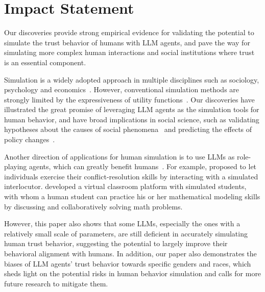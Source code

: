 \section{Impact Statement}\label{impact statement}


Our discoveries provide strong empirical evidence for validating the potential to simulate the trust behavior of humans with LLM agents, and pave the way for simulating more complex human interactions and  social institutions where trust is an essential component. 

Simulation is a widely adopted approach in multiple disciplines such as sociology, psychology and economics~\citep{ziems2023can}. However, conventional simulation methods are strongly limited by the expressiveness of utility functions~\citep{ellsberg1961risk,machina1987choice}. Our discoveries have illustrated the great promise of leveraging LLM agents as the simulation tools for human behavior, and have broad implications in social science, such as validating hypotheses about the causes of social phenomena~\citep{easley2010networks} and predicting the effects of policy changes~\citep{kleinberg2018human}.



Another direction of applications for human simulation is to use LLMs as role-playing agents, which can greatly benefit humans~\citep{yang2024social,chen2024persona,Shanahan2023role,ma2024students}. For example, \cite{shaikh2024rehearsal} proposed to let individuals exercise their conflict-resolution skills by interacting with a simulated interlocutor. \cite{yue2024mathvc} developed a virtual classroom platform with simulated students, with whom a human student can practice his or her mathematical modeling skills by discussing and collaboratively solving math problems. 




However, this paper also shows that some LLMs, especially the ones with a relatively small scale of parameters, are still deficient in accurately simulating human trust behavior, suggesting the potential to largely improve their behavioral alignment with humans. In addition, our paper also demonstrates the biases of LLM agents' trust behavior towards specific genders and races, which sheds light on the potential risks in human behavior simulation and calls for more future research to mitigate them. 





